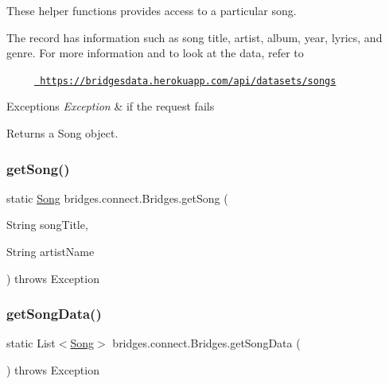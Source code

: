 These helper functions provides access to a particular song.

The record has information such as song title, artist, album, year, lyrics, and genre. For more information and to look at the data, refer to 

~~~~~\href{https://bridgesdata.herokuapp.com/api/datasets/songs}{\texttt{ https\+://bridgesdata.\+herokuapp.\+com/api/datasets/songs}} 


\begin{DoxyExceptions}{Exceptions}
{\em Exception} & if the request fails\\
\hline
\end{DoxyExceptions}
\begin{DoxyReturn}{Returns}
a Song object. 
\end{DoxyReturn}
\mbox{\label{classbridges_1_1connect_1_1_bridges_ae7621c3cfd9978aa02fe243317cf0cca}} 
\subsubsection{\texorpdfstring{getSong()}{getSong()}\hspace{0.1cm}{\footnotesize\ttfamily [2/2]}}
{\footnotesize\ttfamily static \mbox{\hyperlink{classbridges_1_1data__src__dependent_1_1_song}{Song}} bridges.\+connect.\+Bridges.\+get\+Song (\begin{DoxyParamCaption}\item[{String}]{song\+Title,  }\item[{String}]{artist\+Name }\end{DoxyParamCaption}) throws Exception\hspace{0.3cm}{\ttfamily [static]}}

\mbox{\label{classbridges_1_1connect_1_1_bridges_a5bcfed7f065d3c9da31e3551bf31ec7c}} 
\subsubsection{\texorpdfstring{getSongData()}{getSongData()}}
{\footnotesize\ttfamily static List$<$\mbox{\hyperlink{classbridges_1_1data__src__dependent_1_1_song}{Song}}$>$ bridges.\+connect.\+Bridges.\+get\+Song\+Data (\begin{DoxyParamCaption}{ }\end{DoxyParamCaption}) throws Exception\hspace{0.3cm}{\ttfamily [static]}}

